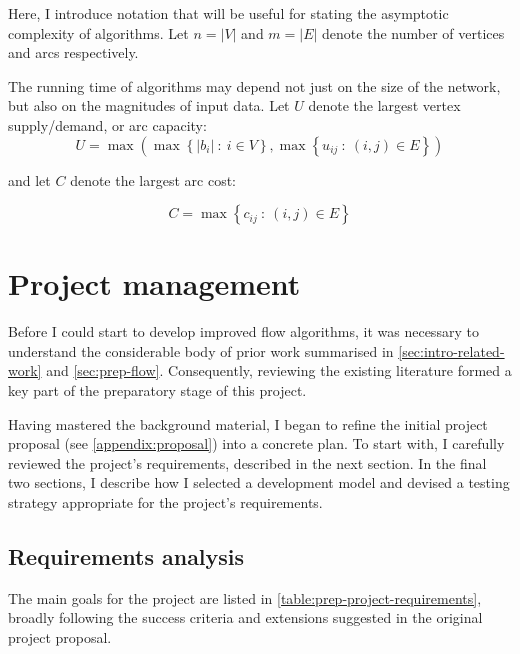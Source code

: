 
Here, I introduce notation that will be useful for stating the asymptotic complexity of algorithms. Let $n=|V|$ and $m=|E|$ denote the number of vertices and arcs respectively.

The running time of algorithms may depend not just on the size of the network, but also on the magnitudes of input data. Let $U$ denote the largest vertex supply/demand, or arc capacity:
\begin{equation}
U=\max\left(\max\left\{ |b_{i}|\::\: i\in V\right\} ,\max\left\{ u_{ij}\::\:\left(i,j\right)\in E\right\} \right)
\end{equation}

and let $C$ denote the largest arc cost:

\begin{equation}
C=\max\left\{ c_{ij}\::\:(i,j)\in E\right\} 
\end{equation}

\section{Project management}

Before I could start to develop improved flow algorithms, it was necessary to understand the considerable body of prior work  summarised in \cref{sec:intro-related-work} and \cref{sec:prep-flow}. Consequently, reviewing the existing literature formed a key part of the preparatory stage of this project. 

Having mastered the background material, I began to refine the initial project proposal (see \cref{appendix:proposal}) into a concrete plan. To start with, I carefully reviewed the project's requirements, described in the next section. In the final two sections, I describe how I selected a development model and devised a testing strategy appropriate for the project's requirements.

\subsection{Requirements analysis} \label{sec:prep-management-requirements}


The main goals for the project are listed in \cref{table:prep-project-requirements}, broadly following the success criteria and extensions suggested in the original project proposal.

